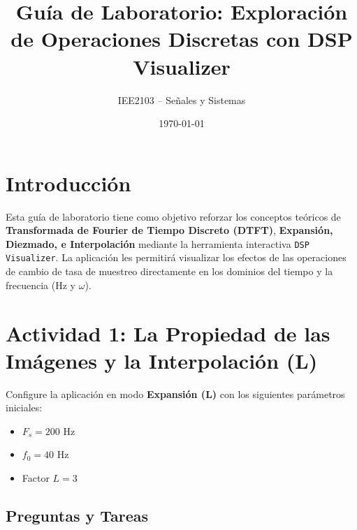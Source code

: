 \documentclass[11pt, a4paper]{article}
\title{Guía de Laboratorio: Exploración de Operaciones Discretas con DSP Visualizer}
\author{IEE2103 -- Señales y Sistemas}
\date{\today}
\begin{document}
\maketitle

\section{Introducción}
Esta guía de laboratorio tiene como objetivo reforzar los conceptos teóricos de \textbf{Transformada de Fourier de Tiempo Discreto (DTFT)}, \textbf{Expansión, Diezmado, e Interpolación} mediante la herramienta interactiva \texttt{DSP Visualizer}. La aplicación les permitirá visualizar los efectos de las operaciones de cambio de tasa de muestreo directamente en los dominios del tiempo y la frecuencia ($\text{Hz}$ y $\omega$).

\begin{center}
\end{center}

\section{Actividad 1: La Propiedad de las Imágenes y la Interpolación ($\mathbf{L}$)}

Configure la aplicación en modo \textbf{Expansión (L)} con los siguientes parámetros iniciales:
\begin{itemize}
    \item $F_s = 200 \text{ Hz}$
    \item $f_0 = 40 \text{ Hz}$
    \item Factor $L = 3$
\end{itemize}

\subsection{Preguntas y Tareas}
\end{document}
